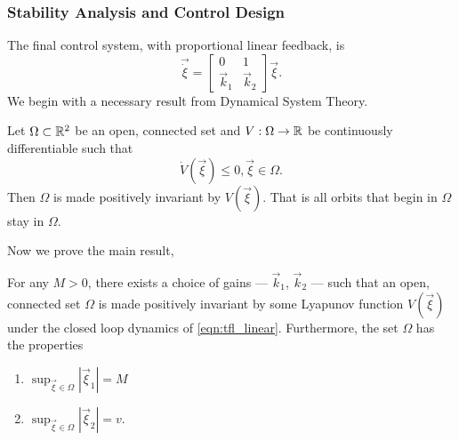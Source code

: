 \subsubsection{Stability Analysis and Control Design}\label{sec:sf_stability_analysis}
The final control system, with proportional linear feedback, is
\begin{equation}
    \vec{\dot{\xi}} =   \begin{bmatrix}
                            0 & 1 \\
                            \vec{k}_1 & \vec{k}_2
                        \end{bmatrix}
                        \vec{\xi}.
    \label{eqn:tfl_linear}
\end{equation}
We begin with a necessary result from Dynamical System Theory.
\begin{theorem}
    Let $\Omega\subset\mathbb{R}^2$ be an open, connected set and $V:\Omega\to\mathbb{R}$ be continuously differentiable such that $$ \dot{V}(\vec{\xi})\leq 0, \vec{\xi}\in\Omega.$$ Then $\Omega$ is made positively invariant by $V(\vec{\xi})$. That is all orbits that begin in $\Omega$ stay in $\Omega$.
    \label{thm:lasalle}
\end{theorem}
Now we prove the main result,
\begin{theorem}
    For any $M>0$, there exists a choice of gains --- $\vec{k}_1$, $\vec{k}_2$ --- such that an open, connected set $\Omega$ is made positively invariant by some Lyapunov function $V(\vec{\xi})$ under the closed loop dynamics of \eqref{eqn:tfl_linear}. Furthermore, the set $\Omega$ has the properties
    \begin{enumerate}
        \item $\sup_{\vec{\xi}\in\Omega}{\left|\vec{\xi}_1\right|} = M$
        \item $\sup_{\vec{\xi}\in\Omega}{\left|\vec{\xi}_2\right|} = v$.
    \end{enumerate}
    \label{thm:sf_stability}
\end{theorem}
